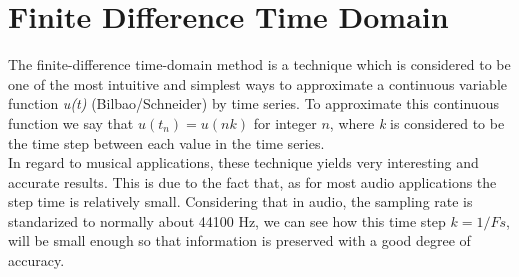 \chapter{Finite Difference Time Domain}
\label{chapter2}
The finite-difference time-domain method is a technique which is considered to be one of the most intuitive and simplest ways to approximate a continuous variable function \textit{u(t)} (Bilbao/Schneider) by time series. To approximate this continuous function we say that $u(t_{n})=u(nk)$ for integer $n$, where \textit{k} is considered to be the time step between each value in the time series.\\
In regard to musical applications, these technique yields very interesting and accurate results. This is due to the fact that, as for most audio applications the step time is relatively small. Considering that in audio, the sampling rate is standarized to normally about 44100 Hz, we can see how this time step $k=1/Fs$, will be small enough so that information is preserved with a good degree of accuracy. 

